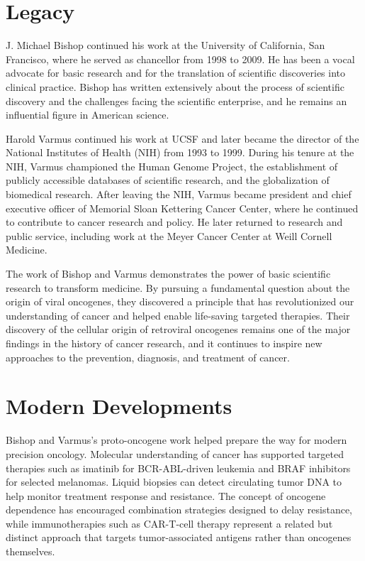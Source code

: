 \section{Legacy}

J. Michael Bishop continued his work at the University of California, San Francisco, where he served as chancellor from 1998 to 2009. He has been a vocal advocate for basic research and for the translation of scientific discoveries into clinical practice. Bishop has written extensively about the process of scientific discovery and the challenges facing the scientific enterprise, and he remains an influential figure in American science.

Harold Varmus continued his work at UCSF and later became the director of the National Institutes of Health (NIH) from 1993 to 1999. During his tenure at the NIH, Varmus championed the Human Genome Project, the establishment of publicly accessible databases of scientific research, and the globalization of biomedical research. After leaving the NIH, Varmus became president and chief executive officer of Memorial Sloan Kettering Cancer Center, where he continued to contribute to cancer research and policy. He later returned to research and public service, including work at the Meyer Cancer Center at Weill Cornell Medicine.

The work of Bishop and Varmus demonstrates the power of basic scientific research to transform medicine. By pursuing a fundamental question about the origin of viral oncogenes, they discovered a principle that has revolutionized our understanding of cancer and helped enable life-saving targeted therapies. Their discovery of the cellular origin of retroviral oncogenes remains one of the major findings in the history of cancer research, and it continues to inspire new approaches to the prevention, diagnosis, and treatment of cancer.


\section{Modern Developments}

Bishop and Varmus's proto-oncogene work helped prepare the way for modern precision oncology. Molecular understanding of cancer has supported targeted therapies such as imatinib for BCR-ABL-driven leukemia and BRAF inhibitors for selected melanomas. Liquid biopsies can detect circulating tumor DNA to help monitor treatment response and resistance. The concept of oncogene dependence has encouraged combination strategies designed to delay resistance, while immunotherapies such as CAR-T-cell therapy represent a related but distinct approach that targets tumor-associated antigens rather than oncogenes themselves.


